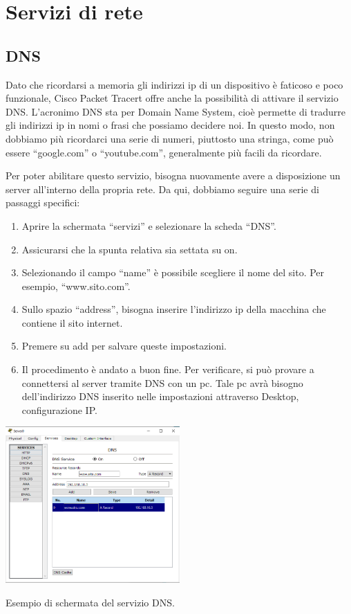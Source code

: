 \section{Servizi di rete}
\subsection{DNS}
Dato che ricordarsi a memoria gli indirizzi ip di un dispositivo è faticoso e poco funzionale, Cisco Packet Tracert offre anche la possibilità di attivare il servizio DNS. L’acronimo DNS sta per Domain Name System, cioè permette di tradurre gli indirizzi ip in nomi o frasi che possiamo decidere noi. In questo modo, non dobbiamo più ricordarci una serie di numeri, piuttosto una stringa, come può essere “google.com” o “youtube.com”, generalmente più facili da ricordare.

Per poter abilitare questo servizio, bisogna nuovamente avere a disposizione un server all’interno della propria rete. Da qui, dobbiamo seguire una serie di passaggi specifici:

\begin{enumerate}
    \item Aprire la schermata “servizi” e selezionare la scheda “DNS”.
    \item Assicurarsi che la spunta relativa sia settata su on.
    \item Selezionando il campo “name” è possibile scegliere il nome del sito. Per esempio, “www.sito.com”.
    \item Sullo spazio “address”, bisogna inserire l’indirizzo ip della macchina che contiene il sito internet.
    \item Premere su add per salvare queste impostazioni.
    \item Il procedimento è andato a buon fine. Per verificare, si può provare a connettersi al server tramite DNS con un pc. Tale pc avrà bisogno dell’indirizzo DNS inserito nelle impostazioni attraverso Desktop, configurazione IP.
\end{enumerate}

\begin{sfigure}
    \centering
    \captionsetup{type=figure}
    \includegraphics[width=0.5\textwidth]{images/06.servizi-rete/dns/01.conf-server.png}
    \caption{Esempio di schermata del servizio DNS.}
    \label{fig:dns-conf-server}
\end{sfigure}


